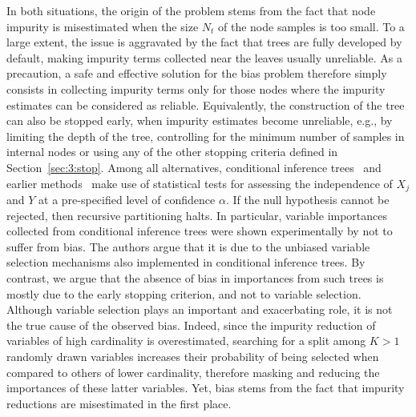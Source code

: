 In both situations, the origin of the problem stems from the fact that node
impurity is misestimated when the size $N_t$ of the node samples is too small.
To a large extent, the issue is aggravated by the fact that trees are fully
developed by default, making impurity terms collected near the leaves usually
unreliable. As a precaution, a safe and effective solution for the bias problem
therefore simply consists in collecting impurity terms only for those nodes
where the impurity estimates can be considered as reliable. Equivalently, the
construction of the tree can also be stopped early, when impurity estimates
become unreliable, e.g., by limiting the depth of the tree, controlling for the
minimum number of samples in internal nodes or using any of the other  stopping
criteria defined in Section~\ref{sec:3:stop}. Among all alternatives,
conditional inference trees~\citep{hothorn:2006} and earlier
methods~\citep{quinlan:1986,wehenkel:1998} make use of statistical tests for
assessing the independence of $X_j$ and $Y$ at a pre-specified level of
confidence $\alpha$. If the null hypothesis cannot be rejected, then recursive
partitioning halts. In particular, variable importances collected from
conditional inference trees were shown experimentally by \citet{strobl:2007b}
not to suffer from bias. The authors argue that it is due to the unbiased
variable selection mechanisms also implemented in conditional inference trees.
By contrast, we argue that the absence of bias in importances from such trees
is mostly due to the early stopping criterion, and not to variable selection.
Although variable selection plays an important and exacerbating role, it is not
the true cause of the  observed bias. Indeed, since the impurity reduction of
variables of high cardinality is overestimated, searching for a split among
$K>1$ randomly drawn variables increases their probability of being selected
when compared to others of lower cardinality, therefore masking and reducing
the importances of these latter variables. Yet, bias stems from the fact
that impurity reductions are misestimated in the first place.

